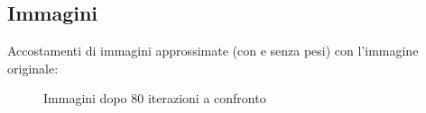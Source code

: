 \documentclass[a4paper]{article} %
\begin{document}
\subsection{Immagini}
Accostamenti di immagini approssimate (con e senza pesi) con l'immagine originale:

\begin{figure}[h]
  \centering
  \hspace{2mm}
  \caption{Immagini dopo 80 iterazioni a confronto}
\end{figure}
\end{document}
